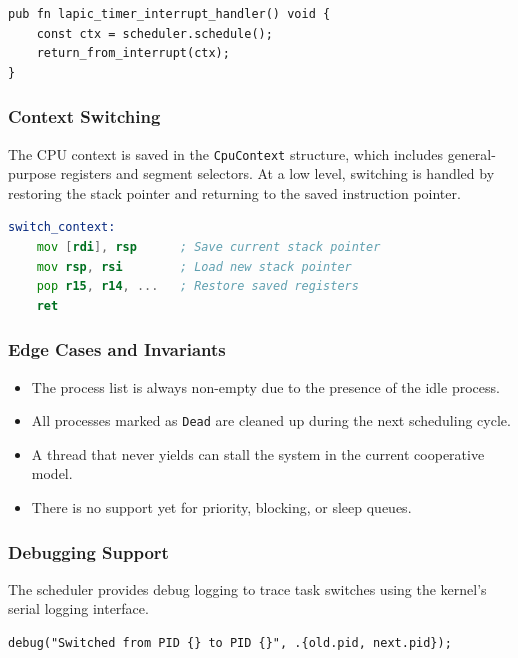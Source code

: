 \documentclass[12pt]{extarticle}
\begin{document}
\begin{lstlisting}[language=zig, breaklines=true, basicstyle=\ttfamily\footnotesize]
pub fn lapic_timer_interrupt_handler() void {
    const ctx = scheduler.schedule();
    return_from_interrupt(ctx);
}
\end{lstlisting}

\subsubsection*{Context Switching}

The CPU context is saved in the \texttt{CpuContext} structure, which includes general-purpose registers and segment selectors. At a low level, switching is handled by restoring the stack pointer and returning to the saved instruction pointer.

\begin{lstlisting}[language=asm, breaklines=true, basicstyle=\ttfamily\footnotesize]
switch_context:
    mov [rdi], rsp      ; Save current stack pointer
    mov rsp, rsi        ; Load new stack pointer
    pop r15, r14, ...   ; Restore saved registers
    ret
\end{lstlisting}

\subsubsection*{Edge Cases and Invariants}

\begin{itemize}
    \item The process list is always non-empty due to the presence of the idle process.
    \item All processes marked as \texttt{Dead} are cleaned up during the next scheduling cycle.
    \item A thread that never yields can stall the system in the current cooperative model.
    \item There is no support yet for priority, blocking, or sleep queues.
\end{itemize}

\subsubsection*{Debugging Support}

The scheduler provides debug logging to trace task switches using the kernel’s serial logging interface.

\begin{lstlisting}[language=zig, breaklines=true, basicstyle=\ttfamily\footnotesize]
debug("Switched from PID {} to PID {}", .{old.pid, next.pid});
\end{lstlisting}
\end{document}
